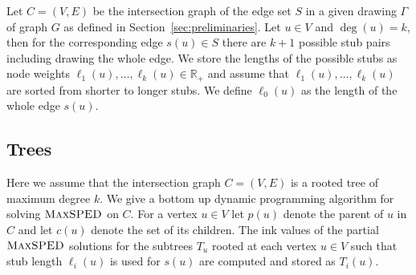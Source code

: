 \documentclass[a4paper,english,numberwithinsect]{eurocg18}
\newcommand{\martin}[1]{\todo[inline,color=blue!40]{MN: #1}}
\newcommand{\fabian}[1]{\todo[inline,color=pink!40]{FK: #1}}
\newcommand{\maxsped}{\ensuremath{\textsc{MaxSPED}}\xspace}
\begin{document}
Let $ C = (V,E) $ be the intersection graph of the edge set $S$ in a given drawing $\Gamma$ of graph $ G $ as defined in Section~\ref{sec:preliminaries}. Let $ u \in V $ and $ \deg(u) = k $, then for the corresponding edge $ s(u) \in S $ there are $ k + 1 $ possible stub pairs including drawing the whole edge. We store the lengths of the possible stubs as node weights $ \ell_1(u), \dots, \ell_k(u) \in \mathbb{R}_+$ and assume that $ \ell_1(u),\dots,\ell_k(u) $ are sorted from shorter to longer stubs. We define  $ \ell_0(u) $ as the length of the whole edge $ s(u) $. 

%

\subsection{Trees}
\label{sec:tree}
Here we assume that the intersection graph $ C = (V,E) $ is a rooted tree of maximum degree $ k $. We give a bottom up dynamic programming algorithm for solving \maxsped on $ C $. For a vertex $ u \in V $ let $ p(u) $ denote the parent of $ u $ in $ C $ and let $ c(u) $ denote the set of its children. The ink values of the partial \maxsped solutions for the subtrees $T_u$ rooted at each vertex $ u \in V $ such that stub length $ \ell_i(u) $ is used for $s(u)$ are computed and stored as $ T_i(u) $.
\end{document}
